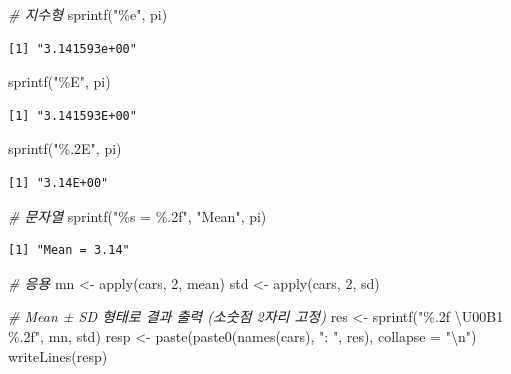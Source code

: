 \documentclass[
  11pt,
]{krantz}
\newenvironment{Shaded}{\begin{snugshade}}{\end{snugshade}}
\newcommand{\AttributeTok}[1]{\textcolor[rgb]{0.61,0.61,0.61}{#1}}
\newcommand{\CommentTok}[1]{\textcolor[rgb]{0.37,0.37,0.37}{\textit{#1}}}
\newcommand{\DecValTok}[1]{\textcolor[rgb]{0.06,0.06,0.06}{#1}}
\newcommand{\FunctionTok}[1]{\textcolor[rgb]{0,0,0}{#1}}
\newcommand{\NormalTok}[1]{#1}
\newcommand{\OtherTok}[1]{\textcolor[rgb]{0.37,0.37,0.37}{#1}}
\newcommand{\SpecialCharTok}[1]{\textcolor[rgb]{0,0,0}{#1}}
\newcommand{\StringTok}[1]{\textcolor[rgb]{0.5,0.5,0.5}{#1}}
\begin{document}
\begin{Shaded}
\begin{Highlighting}[]
\CommentTok{\# 지수형}
\FunctionTok{sprintf}\NormalTok{(}\StringTok{"\%e"}\NormalTok{, pi)}
\end{Highlighting}
\end{Shaded}

\begin{verbatim}
[1] "3.141593e+00"
\end{verbatim}

\begin{Shaded}
\begin{Highlighting}[]
\FunctionTok{sprintf}\NormalTok{(}\StringTok{"\%E"}\NormalTok{, pi)}
\end{Highlighting}
\end{Shaded}

\begin{verbatim}
[1] "3.141593E+00"
\end{verbatim}

\begin{Shaded}
\begin{Highlighting}[]
\FunctionTok{sprintf}\NormalTok{(}\StringTok{"\%.2E"}\NormalTok{, pi)}
\end{Highlighting}
\end{Shaded}

\begin{verbatim}
[1] "3.14E+00"
\end{verbatim}

\begin{Shaded}
\begin{Highlighting}[]
\CommentTok{\# 문자열 }
\FunctionTok{sprintf}\NormalTok{(}\StringTok{"\%s = \%.2f"}\NormalTok{, }\StringTok{"Mean"}\NormalTok{, pi)}
\end{Highlighting}
\end{Shaded}

\begin{verbatim}
[1] "Mean = 3.14"
\end{verbatim}

\begin{Shaded}
\begin{Highlighting}[]
\CommentTok{\# 응용 }
\NormalTok{mn }\OtherTok{\textless{}{-}} \FunctionTok{apply}\NormalTok{(cars, }\DecValTok{2}\NormalTok{, mean)}
\NormalTok{std }\OtherTok{\textless{}{-}} \FunctionTok{apply}\NormalTok{(cars, }\DecValTok{2}\NormalTok{, sd)}

\CommentTok{\# Mean ± SD 형태로 결과 출력 (소숫점 2자리 고정)}
\NormalTok{res }\OtherTok{\textless{}{-}} \FunctionTok{sprintf}\NormalTok{(}\StringTok{"\%.2f \textbackslash{}U00B1 \%.2f"}\NormalTok{, mn, std)}
\NormalTok{resp }\OtherTok{\textless{}{-}} \FunctionTok{paste}\NormalTok{(}\FunctionTok{paste0}\NormalTok{(}\FunctionTok{names}\NormalTok{(cars), }\StringTok{": "}\NormalTok{, res), }\AttributeTok{collapse =} \StringTok{"}\SpecialCharTok{\textbackslash{}n}\StringTok{"}\NormalTok{)}
\FunctionTok{writeLines}\NormalTok{(resp)}
\end{Highlighting}
\end{Shaded}
\end{document}
